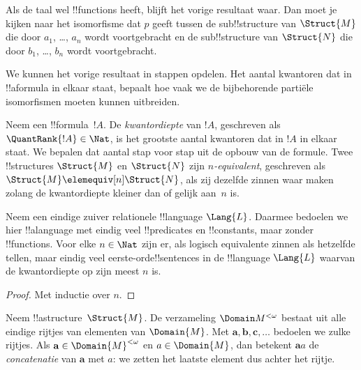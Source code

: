 \documentclass[../../../include/open-logic-section]{subfiles}
\begin{document}
\begin{rem}
Als de taal wel !!{function}s heeft, blijft het vorige resultaat waar.
Dan moet je kijken naar het isomorfisme dat $p$ geeft tussen de
sub!!{structure} van $\Struct{M}$ die door $a_1$, \dots, $a_n$ wordt
voortgebracht en de sub!!{structure} van $\Struct{N}$ die door
$b_1$, \dots, $b_n$ wordt voortgebracht.
\end{rem}

We kunnen het vorige resultaat in stappen opdelen. Het aantal kwantoren
dat in !!a{formula} in elkaar staat, bepaalt hoe vaak we de bijbehorende
partiële isomorfismen moeten kunnen uitbreiden.

\begin{defn}
  Neem een !!{formula}~$!A$. De \emph{kwantordiepte} van $!A$,
  geschreven als $\QuantRank{!A} \in \Nat$, is het grootste aantal
  kwantoren dat in $!A$ in elkaar staat. We bepalen dat aantal stap
  voor stap uit de opbouw van de formule. Twee !!{structure}s
  $\Struct{M}$ en $\Struct{N}$ zijn \emph{$n$-equivalent}, geschreven
  als $\Struct{M} \elemequiv[n] \Struct{N}$, als zij dezelfde zinnen
  waar maken zolang de kwantordiepte kleiner dan of gelijk aan~$n$ is.
\end{defn}

\begin{prop}
  Neem een eindige zuiver relationele !!{language} $\Lang{L}$. Daarmee
  bedoelen we hier !!a{language} met eindig veel !!{predicate}s en
  !!{constant}s, maar zonder !!{function}s. Voor elke $n \in \Nat$
  zijn er, als logisch equivalente zinnen als hetzelfde tellen, maar
  eindig veel eerste-orde!!{sentence}s in de !!{language} $\Lang{L}$
  waarvan de kwantordiepte op zijn meest $n$ is.
\end{prop}

\begin{proof}
  Met inductie over $n$.
\end{proof}

\begin{defn}
  Neem !!a{structure}~$\Struct{M}$. De verzameling
  $\Domain M^{<\omega}$ bestaat uit alle eindige rijtjes van elementen
  van $\Domain{M}$. Met $\mathbf{a}, \mathbf{b}, \mathbf{c}, \ldots$
  bedoelen we zulke rijtjes. Als
  $\mathbf{a} \in \Domain{M}^{<\omega}$ en $a \in \Domain{M}$, dan
  betekent $\mathbf{a}a$ de \emph{concatenatie} van $\mathbf{a}$ met
  $a$: we zetten het laatste element dus achter het rijtje.
\end{defn}
\end{document}

